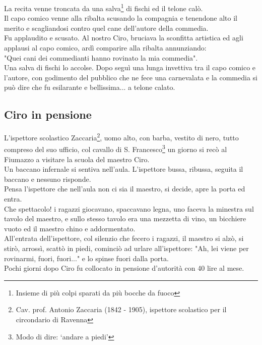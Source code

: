 \documentclass[10pt]{memoir} %
\begin{document}
La recita venne troncata da una salva\footnote{Insieme di più colpi sparati da più bocche da fuoco} di fischi ed il telone calò.\\
Il capo comico venne alla ribalta scusando la compagnia e tenendone alto il merito e scagliandosi contro quel cane dell'autore della commedia.\\
Fu applaudito e scusato. Al nostro Ciro, bruciava la sconfitta artistica ed agli applausi al capo comico, ardì comparire alla ribalta annunziando:\\
"Quei cani dei commedianti hanno rovinato la mia commedia".\\
Una salva di fischi lo accolse. Dopo seguì una lunga invettiva tra il capo comico e l'autore, con godimento del pubblico che ne fece una carnevalata e la commedia si può dire che fu esilarante e bellissima... a telone calato. 

\subsection{Ciro in pensione}
L'ispettore scolastico Zaccaria\footnote{Cav. prof. Antonio Zaccaria (1842 - 1905), ispettore scolastico per il circondario di Ravenna}, uomo alto, con barba, vestito di nero, tutto compreso del suo ufficio, col cavallo di S. Francesco\footnote{Modo di dire: ‘andare a piedi'} un giorno si recò al Fiumazzo a visitare la scuola del maestro Ciro.\\
Un baccano infernale si sentiva nell'aula. L'ispettore bussa, ribussa, seguita il baccano e nessuno risponde.\\
Pensa l'ispettore che nell'aula non ci sia il maestro, si decide, apre la porta ed entra.\\
Che spettacolo! i ragazzi giocavano, spaccavano legna, uno faceva la minestra sul tavolo del maestro, e sullo stesso tavolo era una mezzetta di vino, un bicchiere vuoto ed il maestro chino e addormentato.\\
All'entrata dell'ispettore, col silenzio che fecero i ragazzi, il maestro si alzò, si stirò, arrossì, scattò in piedi, cominciò ad urlare all'ispettore: "Ah, lei viene per rovinarmi, fuori, fuori..." e lo spinse fuori dalla porta.\\
Pochi giorni dopo Ciro fu collocato in pensione d'autorità con 40 lire al mese.
\end{document}
